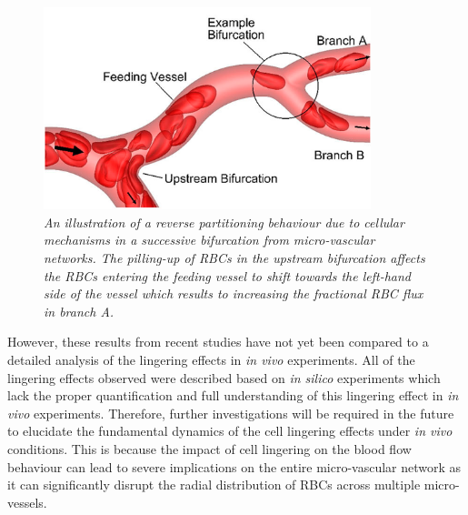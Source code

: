 \begin{figure}[H]
\centering
\includegraphics[width=0.85\textwidth]{images/CellularMechanisms.png}
\caption{\textit{An illustration of a reverse partitioning behaviour due to cellular mechanisms in a successive bifurcation from micro-vascular networks. The pilling-up of RBCs in the upstream bifurcation affects the RBCs entering the feeding vessel to shift towards the left-hand side of the vessel which results to increasing the fractional RBC flux in branch A.\cite{Balogh2018}} \label{CellularMechanisms}}
\end{figure}

\noindent However, these results from recent studies\cite{Balogh2018, Balogh2017DirectNetworks, KihmAlexander2021LDiM} have not yet been compared to a detailed analysis of the lingering effects in \textit{in vivo} experiments. All of the lingering effects observed were described based on \textit{in silico} experiments which lack the proper quantification and full understanding of this lingering effect in \textit{in vivo} experiments. Therefore, further investigations will be required in the future to elucidate the fundamental dynamics of the cell lingering effects under \textit{in vivo} conditions. This is because the impact of cell lingering on the blood flow behaviour can lead to severe implications on the entire micro-vascular network as it can significantly disrupt the radial distribution of RBCs across multiple micro-vessels.  





